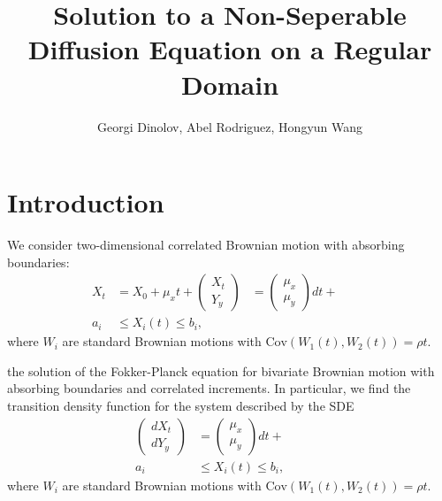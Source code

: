 \documentclass[10pt]{article}
\title{Solution to a Non-Seperable Diffusion Equation on a Regular Domain}
\author{Georgi Dinolov, Abel Rodriguez, Hongyun Wang}
\date{} %
\begin{document}
\def\spacingset#1{\renewcommand{\baselinestretch}%
{#1}\small\normalsize} \spacingset{1}

\bigskip

\vspace{1cm}
\noindent

\spacingset{1.00} %
\section{Introduction}

We consider two-dimensional correlated Brownian motion with absorbing boundaries:
\begin{align}
  X_t &= X_0 + \mu_x t + 
  
  \left( \begin{array}{c}
           X_t \\
           Y_y \end{array} \right) &=   \left( \begin{array}{c}
                                                   \mu_x \\
                                                   \mu_y \end{array} \right) dt + 
  
  \label{eq:1} \\
  a_i &\leq X_i(t) \leq b_i, &&  &&  \label{eq:2}
\end{align}
where $W_i$ are standard Brownian motions with
$\mbox{Cov}(W_1(t), W_2(t)) = \rho t$.


the solution of the Fokker-Planck equation for bivariate
Brownian motion with absorbing boundaries and correlated
increments. In particular, we find the transition density function for
the system described by the SDE
\begin{align}
  \left( \begin{array}{c}
           d X_t \\
           d Y_y \end{array} \right) &=   \left( \begin{array}{c}
                                                   \mu_x \\
                                                   \mu_y \end{array} \right) dt + 
  
  \label{eq:1} \\
  a_i &\leq X_i(t) \leq b_i, &&  &&  \label{eq:2}
\end{align}
where $W_i$ are standard Brownian motions with
$\mbox{Cov}(W_1(t), W_2(t)) = \rho t$.
\end{document}
